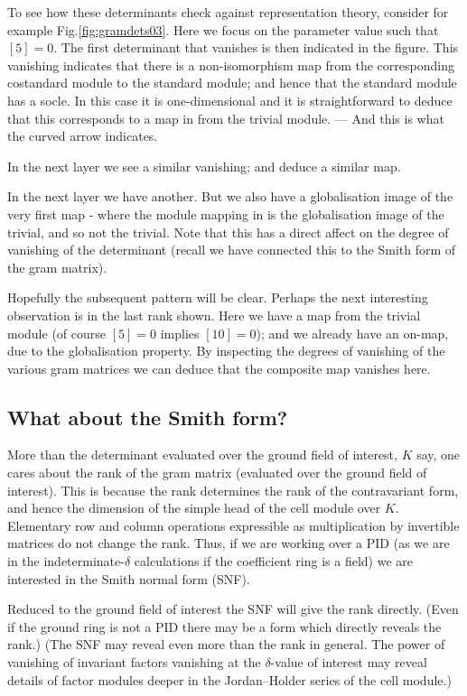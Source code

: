 
\noindent 
To see how these determinants check against representation theory,
consider for example Fig.\ref{fig:gramdets03}.
Here we focus on the parameter value such that $[5]=0$.
The first determinant that vanishes is then indicated in the figure.
This vanishing indicates that there is a non-isomorphism map from
the corresponding costandard module to the standard module;
and hence that the standard module has a socle.
In this case it is one-dimensional and it is straightforward to deduce that
this corresponds to a map in from the trivial module.
--- And this is what the curved arrow indicates.

In the next layer we see a similar vanishing; and deduce a similar map.

In the next layer we have another. But we also have a globalisation image of
the very first map - where the module mapping in is
the globalisation image of the trivial, and so 
not the trivial.
Note that this has a direct affect on the degree of vanishing of the determinant (recall we have connected this to the Smith form of the gram matrix). 

Hopefully the subsequent pattern will be clear.
Perhaps the next interesting observation is in the last rank shown.
Here we have a map from the trivial module (of course $[5]=0$ implies $[10]=0$);
and we already have an on-map, due to the globalisation property. 
By inspecting the degrees of vanishing of the various gram matrices we can
deduce that the composite map vanishes here.


\vspace{.5cm}
\subsection{What about the Smith form?} 
More than the determinant evaluated over the ground field of interest,
$K$ say,
one cares about the rank of the gram matrix
(evaluated over the ground field of interest).
This is because the rank
 determines the rank of the contravariant form, and hence
the dimension of the simple head of the cell module over $K$. 
Elementary row and column operations expressible as multiplication by 
invertible matrices do not change the rank. Thus, if we are working
over a PID (as we are in the indeterminate-$\delta$ calculations 
if the coefficient ring is a field)
we are interested in the Smith normal form (SNF).

Reduced to the ground field of interest the SNF will give the rank
directly.
(Even if the ground ring is not a PID there may be a form which
directly reveals the rank.)
(The SNF may reveal even more than the rank in general. 
The power of vanishing of
invariant factors vanishing   %
at the $\delta$-value 
of interest may reveal details of factor modules deeper in the
Jordan--Holder series of the cell module.) 

